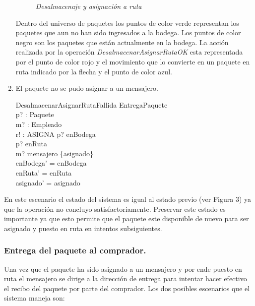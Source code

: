 \documentclass[12pt,a4paper]{article}
\begin{document}
\begin{enumerate}
\begin{figure}[h]
\caption{\textit{Desalmacenaje y asignación a ruta}} \label{fig:M1}
\end{figure}

Dentro del universo de paquetes los puntos de color verde representan los paquetes que aun no han sido ingresados a la bodega. Los puntos de color negro son los paquetes que están actualmente en la bodega. La acción realizada por la operación \textit{DesalmacenarAsignarRutaOK} esta representada por el punto de color rojo y el movimiento que lo convierte en un paquete en ruta indicado por la flecha y el punto de color azul.

\item El paquete no se pudo asignar a un mensajero.

\begin{schema}{DesalmacenarAsignarRutaFallida}
\Xi EntregaPaquete\\
p? : Paquete\\
m? : Empleado\\
r! : ASIGNA
\where
p? \in enBodega\\
p? \notin  enRuta\\
m? \notin mensajero \setminus \{\ran asignado\}\\
enBodega' = enBodega\\
enRuta' = enRuta\\
asignado' = asignado
\end{schema}
\end{enumerate}

En este escenario el estado del sistema es igual al estado previo (ver Figura 3) ya que la operación no concluyo satisfactoriamente. Preservar este estado es importante ya que esto permite que el paquete este disponible de nuevo para ser asignado y puesto en ruta en intentos subsiguientes.

\subsubsection{Entrega del paquete al comprador.}
Una vez que el paquete ha sido asignado a un mensajero y por ende puesto en ruta el mensajero se dirige a la dirección de entrega para intentar hacer efectivo el recibo del paquete por parte del comprador. Los dos posibles escenarios que el sistema maneja son:
\end{document}
